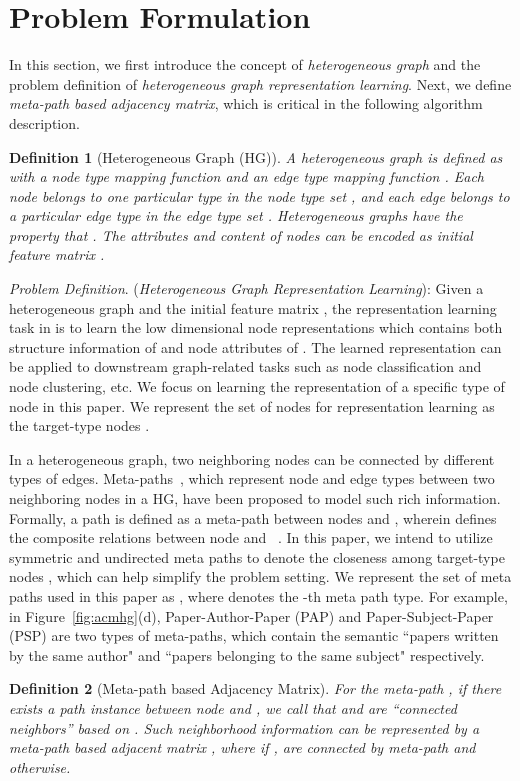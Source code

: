 \documentclass[conference]{IEEEtran}
\newtheorem{defn}{Definition}[section]\usepackage[ruled]{algorithm2e}
\begin{document}
\section{Problem Formulation}
	\label{sec:model}
In this section, we first introduce the concept of \textit{heterogeneous graph} and the problem definition of \textit{heterogeneous graph representation learning}. Next, we define \textit{meta-path based adjacency matrix}, which is critical in the following algorithm description.
	
	\noindent
	\begin{defn}[Heterogeneous Graph (HG)]
		A heterogeneous graph is defined as   with a node type mapping function  and an edge type
		mapping function . Each node  belongs to one particular type in the node type set , and each edge   belongs to a particular edge type in the edge type set . Heterogeneous graphs have the property that . The attributes and content of nodes can be encoded as initial feature matrix .
\end{defn}
	
\noindent
	\emph{Problem Definition}. (\textit{Heterogeneous Graph Representation Learning}):  
	Given a heterogeneous graph  and the initial feature matrix , the representation learning task in  is to learn the low dimensional node representations  which contains both structure information of  and node attributes of . The learned representation  can be applied to downstream graph-related tasks such as node classification and node clustering, etc. 
	We focus on learning the representation of a specific type of node in this paper.
	We represent the set of nodes for representation learning as the target-type nodes .
	
	In a heterogeneous graph, two neighboring nodes can be connected by different types of edges. Meta-paths~\cite{SHYYW11}, which represent node and edge types between two neighboring nodes in a HG, have been proposed to model such rich information.  
Formally, a path 
	is defined as a meta-path between nodes  and , wherein  defines the composite relations between node  and ~\cite{DCS17}.
	In this paper, we intend to utilize symmetric and undirected meta paths to denote the closeness among target-type nodes , which can help simplify the problem setting. We represent the set of meta paths used in this paper as , where  denotes the -th meta path type. For example, in Figure~\ref{fig:acmhg}(d), Paper-Author-Paper (PAP) and Paper-Subject-Paper (PSP) are two types of meta-paths, which contain the semantic ``papers written by the same author" and ``papers belonging to the same subject" respectively.
\noindent
	\begin{defn}[Meta-path based Adjacency Matrix]
		For the meta-path , if there exists a path instance between node  and , we call that  and  are ``connected neighbors'' based on . Such neighborhood information can be represented by a meta-path based adjacent matrix , where  if ,  are connected by meta-path  and  otherwise.
	\end{defn}
\end{document}
